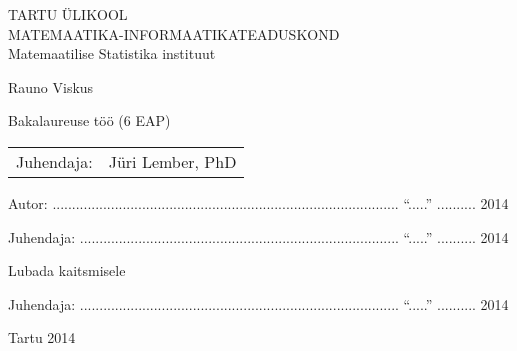 \thispagestyle{empty}
\begin{center}

\large
TARTU ÜLIKOOL\\[2mm]
\uppercase{Matemaatika-Informaatikateaduskond}\\[2mm]
Matemaatilise Statistika instituut\\

\vspace{25mm}

\Large Rauno Viskus

\vspace{4mm}

\huge \thesisTitle

\vspace{20mm}

\Large Bakalaureuse töö (6 EAP)

\end{center}

\vspace{2mm}

\begin{flushright}
 {
 \setlength{\extrarowheight}{5pt}
 \begin{tabular}{r l} 
  \sffamily Juhendaja: & \sffamily Jüri Lember, PhD \\
 \end{tabular}
 }
\end{flushright}

\vspace{10mm}

{\noindent Autor: ......................................................................................... ``.....'' ..........\hskip16pt 2014}
\vspace{2mm}

{\noindent Juhendaja: .................................................................................. ``.....'' ..........\hskip16pt 2014}

\vspace{8mm}

{\noindent Lubada kaitsmisele}

{\noindent Juhendaja: .................................................................................. ``.....'' ..........\hskip16pt 2014}

\vfill
\centerline{Tartu 2014}
